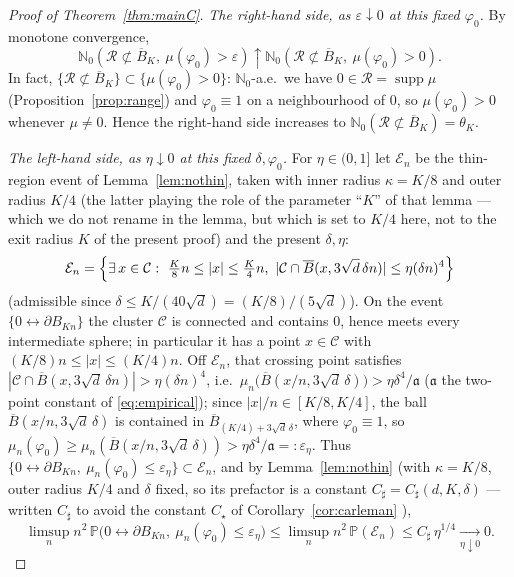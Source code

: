 \documentclass[11pt]{article}
\theoremstyle{definition}
\theoremstyle{remark}
\newcommand{\bP}{\mathbb{P}}
\newcommand{\bN}{{\mathbb{N}_0}}                 %
\newcommand{\supp}{\operatorname{supp}}
\newcommand{\Ran}{\mathcal{R}}                 %
\newcommand{\eps}{\varepsilon}
\numberwithin{equation}{section}
\theoremstyle{plain}
\theoremstyle{definition}
\theoremstyle{remark}
\theoremstyle{plain}
\begin{document}
\begin{proof}[Proof of Theorem~\ref{thm:mainC}]
\emph{The right-hand side, as $\eps\downarrow0$ at this fixed
$\varphi_0$.} By monotone convergence,
\[\bN(\Ran\not\subset\overline B_K,\ \mu(\varphi_0)>\eps)\uparrow
\bN(\Ran\not\subset\overline B_K,\ \mu(\varphi_0)>0).\]
In fact,
$\{\Ran\not\subset\overline B_K\}\subset\{\mu(\varphi_0)>0\}$: $\bN$-a.e.\ we
have $0\in\Ran=\supp\mu$ (Proposition~\ref{prop:range}) and
$\varphi_0\equiv1$ on a neighbourhood of $0$, so $\mu(\varphi_0)>0$ whenever
$\mu\neq0$. Hence the right-hand side
increases to $\bN(\Ran\not\subset\overline B_K)=\theta_K$.

\emph{The left-hand side, as $\eta\downarrow0$ at this fixed
$\delta,\varphi_0$.} For $\eta\in(0,1]$ let $\mathcal E_n$ be the
thin-region event of Lemma~\ref{lem:nothin}, taken with inner radius
$\kappa=K/8$ and outer radius $K/4$ (the latter playing the role of the
parameter ``$K$'' of that lemma --- which we do not rename in the lemma, but
which is set to $K/4$ here, not to the exit radius $K$ of the present proof) and
the present $\delta,\eta$:
\[
\mathcal E_n
=\Bigl\{\exists\,x\in \mathcal C:\ \tfrac K8 n\le|x|\le\tfrac K4 n,\
|\mathcal C\cap \overline B(x,3\sqrt d\,\delta n)|\le\eta(\delta n)^4\Bigr\}
\]
(admissible since $\delta\le K/(40\sqrt d)=(K/8)/(5\sqrt d)$).
On the event $\{0\leftrightarrow\partial B_{Kn}\}$ the cluster $\mathcal C$ is
connected and contains $0$, hence meets every intermediate sphere; in
particular it has a point $x\in \mathcal C$ with $(K/8)n\le|x|\le(K/4)n$. Off
$\mathcal E_n$, that crossing point satisfies
$|\mathcal C\cap \overline B(x,3\sqrt d\,\delta n)|>\eta(\delta n)^4$, i.e.\
$\mu_n\bigl(\overline B(x/n,3\sqrt d\,\delta)\bigr)>\eta\delta^4/\mathfrak a$ ($\mathfrak a$ the
two-point constant of \eqref{eq:empirical}); since
$|x|/n\in[K/8,K/4]$, the ball $\overline B(x/n,3\sqrt d\,\delta)$ is contained in
$\overline B_{(K/4)+3\sqrt d\,\delta}$, where
$\varphi_0\equiv1$, so $\mu_n(\varphi_0)\ge\mu_n(\overline B(x/n,3\sqrt d\,\delta))
>\eta\delta^4/\mathfrak a=:\eps_\eta$. Thus
$\{0\leftrightarrow\partial B_{Kn},\ \mu_n(\varphi_0)\le\eps_\eta\}
\subset\mathcal E_n$, and by Lemma~\ref{lem:nothin} (with $\kappa=K/8$,
outer radius $K/4$ and $\delta$ fixed, so its prefactor is a constant
$C_\sharp=C_\sharp(d,K,\delta)$ --- written $C_\sharp$ to avoid the
constant $C_\star$ of Corollary~\ref{cor:carleman} ),
\[
\limsup_n n^2\,\bP\bigl(0\leftrightarrow\partial B_{Kn},\
\mu_n(\varphi_0)\le\eps_\eta\bigr)
\le\limsup_n n^2\,\bP(\mathcal E_n)
\le C_\sharp\,\eta^{1/4}\xrightarrow[\eta\downarrow0]{}0 .
\]


\end{proof}
\end{document}
